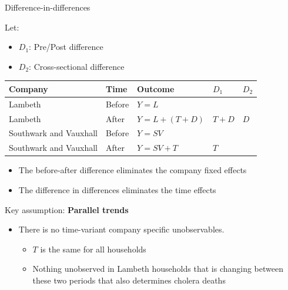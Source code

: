 \documentclass[compress, 8pt]{beamer}
\begin{document}
\begin{frame}{Difference-in-differences}

Let:
\begin{itemize}
    \item $D_1$: Pre/Post difference
    \item $D_2$: Cross-sectional difference
\end{itemize}
\begin{table}
\begin{tabular}{lllll}
\hline
\textbf{Company} &\textbf{Time} &\textbf{Outcome} &$D_1$ &$D_2$ \\
\hline\hline
Lambeth                &Before &$Y = L$            &\\
\hline
Lambeth                &After  &$Y = L + (T + D)$  &$T + D$ &$D$\\
\hline
Southwark and Vauxhall &Before &$Y = SV$           & \\
\hline
Southwark and Vauxhall &After  &$Y = SV + T$       &$T$ \\
\end{tabular}
\end{table}
\begin{itemize}
    \item The before-after difference eliminates the company fixed effects
    \item The difference in differences eliminates the time effects
\end{itemize}

\vspace{2ex}
Key assumption: \textbf{Parallel trends}
\begin{itemize}
    \item There is no time-variant company specific unobservables.
    \begin{itemize}
         \item $T$ is the same for all households
         \item Nothing unobserved in Lambeth households that is changing between these two periods that also determines cholera deaths
     \end{itemize} 
\end{itemize}
\end{frame}
\end{document}
